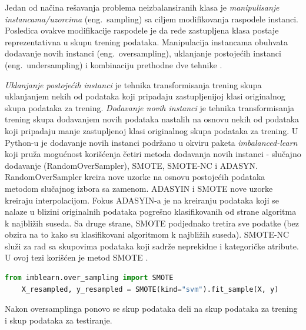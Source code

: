 \documentclass[12pt,oneside]{memoir}
\begin{document}
Jedan od načina rešavanja problema neizbalansiranih klasa je \textit{manipulisanje instancama/uzorcima} (eng.~sampling) sa ciljem modifikovanja raspodele instanci. Posledica ovakve modifikacije raspodele je da ređe zastupljena klasa postaje reprezentativna u skupu trening podataka. Manipulacija instancama obuhvata dodavanje novih instanci (eng.~oversampling), uklanjanje postojećih instanci (eng.~undersampling) i kombinaciju prethodne dve tehnike \cite{mitic}. 

\textit{Uklanjanje postojećih instanci} je tehnika transformisanja trening skupa uklanjanjem nekih od podataka koji pripadaju zastupljenijoj klasi originalnog skupa podataka za trening. 
\textit{Dodavanje novih instanci} je tehnika transformisanja trening skupa dodavanjem novih podataka nastalih na osnovu nekih od podataka koji pripadaju manje zastupljenoj klasi originalnog skupa podataka za trening. U Python-u je dodavanje novih instanci podržano u okviru paketa \textit{imbalanced-learn} koji pruža mogućnost korišćenja četiri metoda dodavanja novih instanci - slučajno dodavanje (RandomOverSampler), SMOTE, SMOTE-NC i ADASYN. RandomOverSampler kreira nove uzorke na osnovu postojećih podataka metodom slučajnog izbora sa zamenom. ADASYIN i SMOTE nove uzorke kreiraju interpolacijom. Fokus ADASYIN-a je na kreiranju podataka koji se nalaze u blizini originalnih podataka pogrešno klasifikovanih od strane algoritma k najbližih suseda. Sa druge strane, SMOTE podjednako tretira sve podatke (bez obzira na to kako su klasifikovani algoritmom k najbližih suseda). SMOTE-NC služi za rad sa skupovima podataka koji sadrže neprekidne i kategoričke atribute. U ovoj tezi korišćen je metod SMOTE \cite{imblearn, mitic}.


\begin{lstlisting}[language=Python, basicstyle=\tiny]
	from imblearn.over_sampling import SMOTE
	X_resampled, y_resampled = SMOTE(kind="svm").fit_sample(X, y)
\end{lstlisting}

Nakon oversamplinga ponovo se skup podataka deli na skup podataka za trening i skup podataka za testiranje. 
\end{document}
